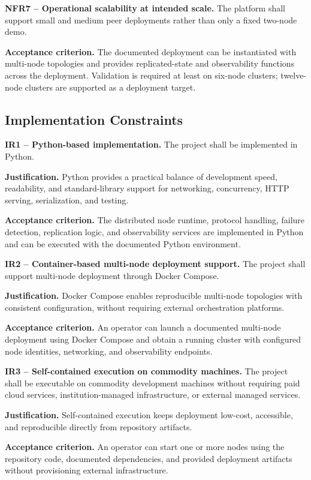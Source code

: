 \medskip
\textbf{NFR7 -- Operational scalability at intended scale.}
The platform shall support small and medium peer deployments rather than only a fixed two-node demo.

\textbf{Acceptance criterion.}
The documented deployment can be instantiated with multi-node topologies and provides replicated-state and observability functions across the deployment. Validation is required at least on six-node clusters; twelve-node clusters are supported as a deployment target.

\subsection{Implementation Constraints}
\label{implementation-constraints}

\textbf{IR1 -- Python-based implementation.}
The project shall be implemented in Python.

\textbf{Justification.}
Python provides a practical balance of development speed, readability, and standard-library support for networking, concurrency, HTTP serving, serialization, and testing.

\textbf{Acceptance criterion.}
The distributed node runtime, protocol handling, failure detection, replication logic, and observability services are implemented in Python and can be executed with the documented Python environment.

\medskip
\textbf{IR2 -- Container-based multi-node deployment support.}
The project shall support multi-node deployment through Docker Compose.

\textbf{Justification.}
Docker Compose enables reproducible multi-node topologies with consistent configuration, without requiring external orchestration platforms.

\textbf{Acceptance criterion.}
An operator can launch a documented multi-node deployment using Docker Compose and obtain a running cluster with configured node identities, networking, and observability endpoints.

\medskip
\textbf{IR3 -- Self-contained execution on commodity machines.}
The project shall be executable on commodity development machines without requiring paid cloud services, institution-managed infrastructure, or external managed services.

\textbf{Justification.}
Self-contained execution keeps deployment low-cost, accessible, and reproducible directly from repository artifacts.

\textbf{Acceptance criterion.}
An operator can start one or more nodes using the repository code, documented dependencies, and provided deployment artifacts without provisioning external infrastructure.

\clearpage
